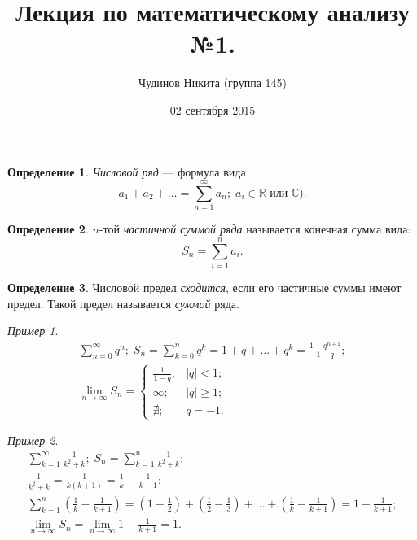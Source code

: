 \documentclass[a4paper,12pt]{article}
\theoremstyle{remark}
\newtheorem*{example}{Пример}
\theoremstyle{definition}
\newtheorem{definition}{Определение}
\begin{document}
\sloppy
\author{Чудинов Никита (группа 145)}
\date{02 сентября 2015}
\title{\vspace{-2.0cm}Лекция по математическому анализу №1.}
\frenchspacing
 
\maketitle


\begin{definition}
\emph{Числовой ряд} --- формула вида
\begin{equation*}
	a_1 + a_2 + \dots = \sum^{\infty}_{n = 1} a_n;\; a_i \in \mathbb{R} \text{ или } \mathbb{C}).
\end{equation*}
\end{definition}

\begin{definition}
\(n\)-той \emph{частичной суммой ряда} называется конечная сумма вида:
\begin{equation*}
	S_n = \sum^{n}_{i = 1} a_i.
\end{equation*}
\end{definition}

\begin{definition}
Числовой предел \emph{сходится}, если его частичные суммы имеют предел. Такой предел называется \emph{суммой} ряда.
\end{definition}

\begin{example}
\begin{gather*}
	\sum^{\infty}_{n = 0} q^n;\; S_n = \sum^{n}_{k = 0} q^k = 1 + q + \dots + q^k = \frac{1 - q^{n+1}}{1-q}; \\
	\lim_{n \rightarrow \infty} S_n = 
	\begin{cases}
		\frac{1}{1 - q}; &|q| < 1; \\
		\infty; &|q| \geqslant 1; \\
		\nexists; &q = -1. 
	\end{cases}
\end{gather*}
\end{example}

\begin{example}
\begin{gather*}
	\sum^{\infty}_{k = 1} \frac{1}{k^2 + k} ;\; S_n = \sum^{n}_{k = 1} \frac{1}{k^2 + k}; \\
	\frac{1}{k^2 + k} = \frac{1}{k (k + 1)} = \frac{1}{k} - \frac{1}{k - 1}; \\
	\sum^{n}_{k = 1} \left(\frac{1}{k} - \frac{1}{k + 1}\right) = \left(1 - \frac{1}{2}\right) + \left(\frac{1}{2} - \frac{1}{3}\right) + \dots + \left(\frac{1}{k} - \frac{1}{k + 1}\right) = 1 - \frac{1}{k + 1}; \\
	\lim_{n \rightarrow \infty} S_n = \lim_{n \rightarrow \infty} 1 - \frac{1}{k + 1} = 1.
\end{gather*}
\end{example}
\end{document}
